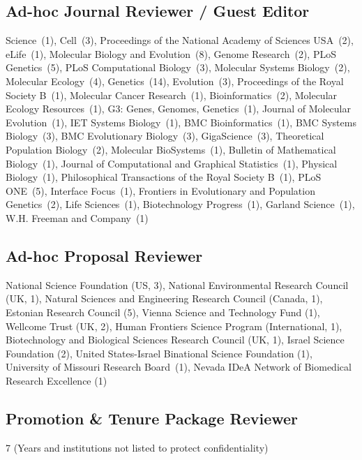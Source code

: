 \documentclass[11pt]{article}
\begin{document}
\subsection*{Ad-hoc Journal Reviewer / Guest Editor}
{Science~(1)},
{Cell~(3)},
{Proceedings of the National Academy of Sciences USA~(2)},
{eLife~(1)},
{Molecular Biology and Evolution~(8)},
{Genome Research~(2)},
{PLoS Genetics~(5)},
{PLoS Computational Biology~(3)},
{Molecular Systems Biology~(2)},
{Molecular Ecology~(4)},
{Genetics~(14)}, 
{Evolution~(3)}, 
{Proceedings of the Royal Society B~(1)},
{Molecular Cancer Research~(1)},
{Bioinformatics~(2)},
{Molecular Ecology Resources~(1)},
{G3: Genes, Genomes, Genetics~(1)},
{Journal of Molecular Evolution~(1)},
{IET Systems Biology~(1)}, 
{BMC Bioinformatics~(1)},
{BMC Systems Biology~(3)}, 
{BMC Evolutionary Biology~(3)},
{GigaScience~(3)},
{Theoretical Population Biology~(2)},
{Molecular BioSystems~(1)},
{Bulletin of Mathematical Biology~(1)},
{Journal of Computational and Graphical Statistics~(1)},
{Physical Biology~(1)},
{Philosophical Transactions of the Royal Society B~(1)},
{PLoS ONE~(5)},
{Interface Focus~(1)},
{Frontiers in Evolutionary and Population Genetics~(2)},
{Life Sciences~(1)},
{Biotechnology Progress~(1)},
{Garland Science~(1)},
{W.H. Freeman and Company~(1)}

\subsection*{Ad-hoc Proposal Reviewer}
National Science Foundation (US, 3), National Environmental Research Council (UK, 1), Natural Sciences and Engineering Research Council (Canada, 1), Estonian Research Council (5), Vienna Science and Technology Fund (1),
Wellcome Trust (UK, 2), Human Frontiers Science Program (International, 1), Biotechnology and Biological Sciences Research Council (UK, 1), Israel Science Foundation (2), United States-Israel Binational Science Foundation (1), University of Missouri Research Board~(1), Nevada IDeA Network of Biomedical Research Excellence (1)


\subsection*{Promotion \& Tenure Package Reviewer}
7 (Years and institutions not listed to protect confidentiality)
\end{document}
